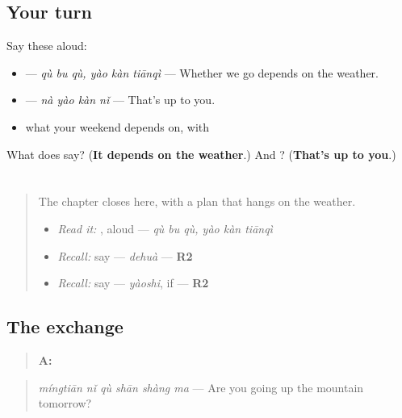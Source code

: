 \subsection*{Your turn}
Say these aloud:

\begin{itemize}
\raggedright
  \item {}  — \emph{qù bu qù, yào kàn tiānqì} — Whether we go depends on the weather.
  \item {} — \emph{nà yào kàn nǐ} — That's up to you.
  \item what your weekend depends on, with 
\end{itemize}

\begin{tcolorbox}[breakable,colback=teal!4,colframe=teal!35!black,title={Before you move on}]
What does  say? (\textbf{It depends on the weather}.) And ? (\textbf{That's up to you}.)
\end{tcolorbox}
\section[Practice]{ }

\label{lesson:ZH-C288-practice}



\begin{quote}
The chapter closes here, with a plan that hangs on the weather.

\begin{itemize}
\raggedright
  \item \emph{Read it:}  , aloud — \emph{qù bu qù, yào kàn tiānqì}
  \item \emph{Recall:} say  — \emph{dehuà} — \textbf{R2}
  \item \emph{Recall:} say  — \emph{yàoshi}, if — \textbf{R2}
\end{itemize}
\end{quote}

\subsection*{The exchange}
\begin{quote}
\textbf{A:} 
\end{quote}

\begin{quote}
\emph{míngtiān nǐ qù shān shàng ma} — Are you going up the mountain tomorrow?
\end{quote}

